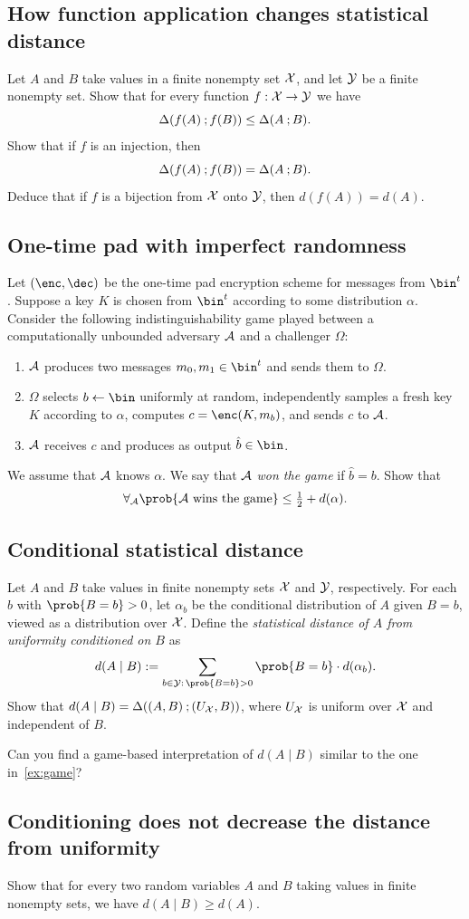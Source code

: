 \documentclass{llncs}
\begin{document}
\subsection{How function application changes statistical distance}\label{ex:function-application}
Let $A$ and $B$ take values in a finite nonempty set ${\mathcal X}$, and let ${\mathcal Y}$ be a finite nonempty set. Show that for every function $f: {\mathcal X} \rightarrow {\mathcal Y}$ we have
\[
\Delta(f(A) \: ; f(B)) \leq \Delta(A \: ; B).
\]
Show that if $f$ is an injection, then
\[
\Delta(f(A) \: ; f(B)) = \Delta(A \: ; B).
\]
Deduce that if $f$ is a bijection from ${\mathcal X}$ onto ${\mathcal Y}$, then $d(f(A)) = d(A)$.




\subsection{One-time pad with imperfect randomness}
Let $(\enc,\dec)$ be the one-time pad encryption scheme for messages from $\bin^t$. Suppose a key $K$ is chosen from $\bin^t$ according to some distribution $\alpha$. Consider the following indistinguishability game played between a computationally unbounded adversary ${\mathcal A}$ and a challenger $\Omega$:
\begin{enumerate}
	\item ${\mathcal A}$ produces two messages $m_0,m_1 \in \bin^t$ and sends them to $\Omega$.
	\item $\Omega$ selects $b\leftarrow\bin$ uniformly at random, independently samples a fresh key $K$ according to $\alpha$, computes $c = \enc(K,m_b)$, and sends $c$ to ${\mathcal A}$.
	\item ${\mathcal A}$ receives $c$ and produces as output $\hat b \in \bin$.
\end{enumerate}
We assume that ${\mathcal A}$ knows $\alpha$. We say that ${\mathcal A}$ \emph{won the game} if $\hat b = b$. Show that
\begin{equation*}
\forall_\cA \prob{\cA\mbox{\ wins the game}} \leq \half + d(\alpha).
\end{equation*}

\subsection{Conditional statistical distance}
Let $A$ and $B$ take values in finite nonempty sets ${\mathcal X}$ and ${\mathcal Y}$, respectively. For each $b$ with $\prob{B=b}>0$, let $\alpha_b$ be the conditional distribution of $A$ given $B=b$, viewed as a distribution over ${\mathcal X}$. Define the \emph{statistical distance of $A$ from uniformity conditioned on $B$} as
\[
d(A\mid B) := \sum_{b \in \cY:\, \prob{B=b}>0} \prob{B=b} \cdot d(\alpha_b).
\]
Show that $d(A\mid B) = \Delta((A,B) \: ; (U_{\mathcal X},B))$, where $U_{\mathcal X}$ is uniform over ${\mathcal X}$ and independent of $B$.

\noindent
Can you find a game-based interpretation of $d(A\mid B)$ similar to the one in~\ref{ex:game}?

\subsection{Conditioning does not decrease the distance from uniformity}
Show that for every two random variables $A$ and $B$ taking values in finite nonempty sets, we have $d(A\mid B) \geq d(A)$.
\end{document}
